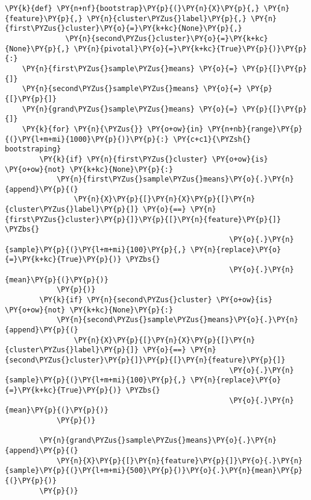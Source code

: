     \begin{tcolorbox}[breakable, size=fbox, boxrule=1pt, pad at break*=1mm,colback=cellbackground, colframe=cellborder]
\begin{Verbatim}[commandchars=\\\{\}]
\PY{k}{def} \PY{n+nf}{bootstrap}\PY{p}{(}\PY{n}{X}\PY{p}{,} \PY{n}{feature}\PY{p}{,} \PY{n}{cluster\PYZus{}label}\PY{p}{,} \PY{n}{first\PYZus{}cluster}\PY{o}{=}\PY{k+kc}{None}\PY{p}{,} 
              \PY{n}{second\PYZus{}cluster}\PY{o}{=}\PY{k+kc}{None}\PY{p}{,} \PY{n}{pivotal}\PY{o}{=}\PY{k+kc}{True}\PY{p}{)}\PY{p}{:}
    \PY{n}{first\PYZus{}sample\PYZus{}means} \PY{o}{=} \PY{p}{[}\PY{p}{]}
    \PY{n}{second\PYZus{}sample\PYZus{}means} \PY{o}{=} \PY{p}{[}\PY{p}{]}
    \PY{n}{grand\PYZus{}sample\PYZus{}means} \PY{o}{=} \PY{p}{[}\PY{p}{]}
    \PY{k}{for} \PY{n}{\PYZus{}} \PY{o+ow}{in} \PY{n+nb}{range}\PY{p}{(}\PY{l+m+mi}{1000}\PY{p}{)}\PY{p}{:} \PY{c+c1}{\PYZsh{} bootstraping}
        \PY{k}{if} \PY{n}{first\PYZus{}cluster} \PY{o+ow}{is} \PY{o+ow}{not} \PY{k+kc}{None}\PY{p}{:}
            \PY{n}{first\PYZus{}sample\PYZus{}means}\PY{o}{.}\PY{n}{append}\PY{p}{(}
                \PY{n}{X}\PY{p}{[}\PY{n}{X}\PY{p}{[}\PY{n}{cluster\PYZus{}label}\PY{p}{]} \PY{o}{==} \PY{n}{first\PYZus{}cluster}\PY{p}{]}\PY{p}{[}\PY{n}{feature}\PY{p}{]} \PYZbs{}
                                                    \PY{o}{.}\PY{n}{sample}\PY{p}{(}\PY{l+m+mi}{100}\PY{p}{,} \PY{n}{replace}\PY{o}{=}\PY{k+kc}{True}\PY{p}{)} \PYZbs{}
                                                    \PY{o}{.}\PY{n}{mean}\PY{p}{(}\PY{p}{)}
            \PY{p}{)}
        \PY{k}{if} \PY{n}{second\PYZus{}cluster} \PY{o+ow}{is} \PY{o+ow}{not} \PY{k+kc}{None}\PY{p}{:}
            \PY{n}{second\PYZus{}sample\PYZus{}means}\PY{o}{.}\PY{n}{append}\PY{p}{(}
                \PY{n}{X}\PY{p}{[}\PY{n}{X}\PY{p}{[}\PY{n}{cluster\PYZus{}label}\PY{p}{]} \PY{o}{==} \PY{n}{second\PYZus{}cluster}\PY{p}{]}\PY{p}{[}\PY{n}{feature}\PY{p}{]}
                                                    \PY{o}{.}\PY{n}{sample}\PY{p}{(}\PY{l+m+mi}{100}\PY{p}{,} \PY{n}{replace}\PY{o}{=}\PY{k+kc}{True}\PY{p}{)} \PYZbs{}
                                                    \PY{o}{.}\PY{n}{mean}\PY{p}{(}\PY{p}{)}
            \PY{p}{)}
            
        \PY{n}{grand\PYZus{}sample\PYZus{}means}\PY{o}{.}\PY{n}{append}\PY{p}{(}
            \PY{n}{X}\PY{p}{[}\PY{n}{feature}\PY{p}{]}\PY{o}{.}\PY{n}{sample}\PY{p}{(}\PY{l+m+mi}{500}\PY{p}{)}\PY{o}{.}\PY{n}{mean}\PY{p}{(}\PY{p}{)}
        \PY{p}{)}
            

\end{Verbatim}
\end{tcolorbox}
